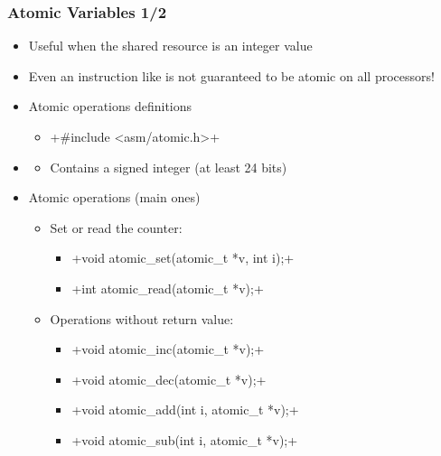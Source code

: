 \begin{frame}[fragile]
  \frametitle{Atomic Variables 1/2}
  \begin{itemize}
  \item Useful when the shared resource is an integer value
  \item Even an instruction like  is not guaranteed to be
    atomic on all processors!
  \item Atomic operations definitions
    \begin{itemize}
    \item {}+#include <asm/atomic.h>+
    \end{itemize}
  \item {}
    \begin{itemize}
    \item Contains a signed integer (at least 24 bits)
    \end{itemize}
  \item Atomic operations (main ones)
    \begin{itemize}
    \item Set or read the counter:
      \begin{itemize}
      \item {}+void atomic_set(atomic_t *v, int i);+
      \item {}+int atomic_read(atomic_t *v);+
      \end{itemize}
    \item Operations without return value:
      \begin{itemize}
      \item {}+void atomic_inc(atomic_t *v);+
      \item {}+void atomic_dec(atomic_t *v);+
      \item {}+void atomic_add(int i, atomic_t *v);+
      \item {}+void atomic_sub(int i, atomic_t *v);+
      \end{itemize}
    \end{itemize}
  \end{itemize}
\end{frame}

